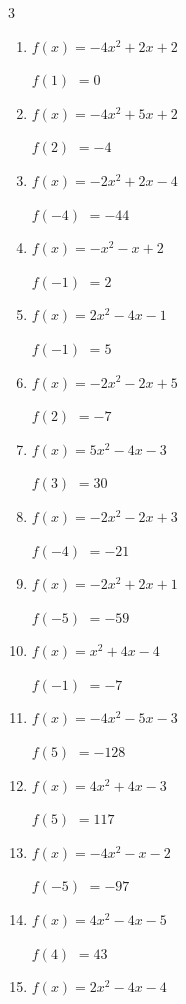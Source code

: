 \begin{multicols}{3}
\begin{enumerate}
$f(-5)$
        $= -80$

\columnbreak %

  \item $f(x)=-4x^{2}+2x+2$

$f(1)$
        $= 0$

  \item $f(x)=-4x^{2}+5x+2$

$f(2)$
        $= -4$

  \item $f(x)=-2x^{2}+2x-4$

$f(-4)$
        $= -44$

  \item $f(x)=-x^{2}-x+2$

$f(-1)$
        $= 2$

  \item $f(x)=2x^{2}-4x-1$

$f(-1)$
        $= 5$

  \item $f(x)=-2x^{2}-2x+5$

$f(2)$
        $= -7$

  \item $f(x)=5x^{2}-4x-3$

$f(3)$
        $= 30$

  \item $f(x)=-2x^{2}-2x+3$

$f(-4)$
        $= -21$

  \item $f(x)=-2x^{2}+2x+1$

$f(-5)$
        $= -59$

  \item $f(x)=x^{2}+4x-4$

$f(-1)$
        $= -7$

  \item $f(x)=-4x^{2}-5x-3$

$f(5)$
        $= -128$

  \item $f(x)=4x^{2}+4x-3$

$f(5)$
        $= 117$

  \item $f(x)=-4x^{2}-x-2$

$f(-5)$
        $= -97$

  \item $f(x)=4x^{2}-4x-5$

$f(4)$
        $= 43$

  \item $f(x)=2x^{2}-4x-4$


\end{enumerate}
\end{multicols}
